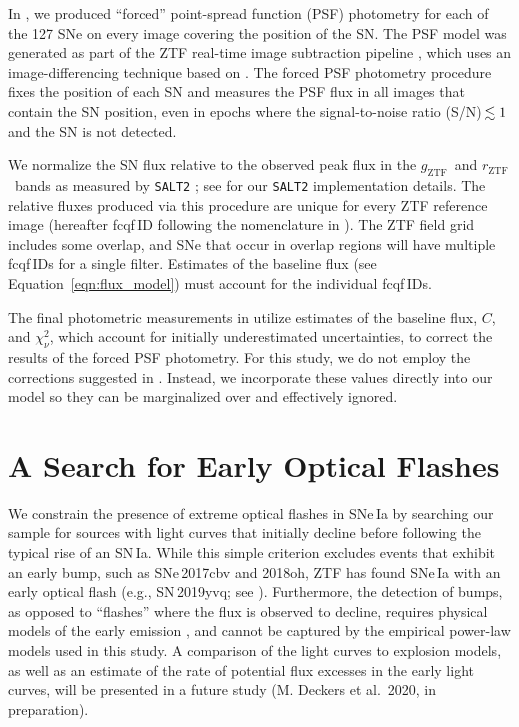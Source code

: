 \documentclass[twocolumn]{./aastex63}
\newcommand{\rztf}{$r_\mathrm{ZTF}$}
\newcommand{\gztf}{$g_\mathrm{ZTF}$}
\begin{document}
In \citet{Yao19}, we produced ``forced'' point-spread function (PSF)
photometry for each of the 127 SNe on every image covering the position of the
SN. The PSF model was generated as part of the ZTF real-time image subtraction
pipeline \citep{Masci19}, which uses an image-differencing technique based on
\citet{Zackay16}. The forced PSF photometry procedure fixes the position of
each SN and measures the PSF flux in all images that contain the SN position,
even in epochs where the signal-to-noise ratio (S/N)\,$\lesssim 1$ and the SN is
not detected.

We normalize the SN flux relative to the observed peak flux in the \gztf\ and
\rztf\ bands as measured by \texttt{SALT2} \citep{Guy07}; see
\citet{Yao19} for our \texttt{SALT2} implementation details. The relative
fluxes produced via this procedure are unique for every ZTF reference image
(hereafter fcqf\,ID following the nomenclature in \citet{Yao19}). The ZTF
field grid includes some overlap, and SNe that occur in overlap regions will
have multiple fcqf\,IDs for a single filter. Estimates of the baseline flux
(see Equation~\ref{eqn:flux_model}) must account for the individual
fcqf\,IDs. 

The final photometric measurements in \citet{Yao19} utilize estimates of the
baseline flux, $C$, and $\chi^2_{\nu}$, which account for initially
underestimated uncertainties, to correct the results of the forced PSF
photometry. For this study, we do not employ the corrections suggested in
\citet{Yao19}. Instead, we incorporate these values directly into our model so
they can be marginalized over and effectively ignored.

\section{A Search for Early Optical Flashes}\label{sec:flash}

We constrain the presence of extreme optical flashes in SNe\,Ia by
searching our sample for sources with light curves that initially decline
before following the typical rise of an SN\,Ia. While this simple criterion
excludes events that exhibit an early bump, such as SNe\,2017cbv and 2018oh,
ZTF has found SNe\,Ia with an early optical flash (e.g., SN\,2019yvq; see
\citep{Miller20a}). Furthermore, the detection of bumps, as opposed to
``flashes'' where the flux is observed to decline, requires physical models of
the early emission \citep[e.g.,][]{Levanon17}, and cannot be captured by the
empirical power-law models used in this study. A comparison of the light
curves to explosion models, as well as an estimate of the rate of potential
flux excesses in the early light curves, will be presented in a future study
(M. Deckers et al.\ 2020, in preparation).
\end{document}
